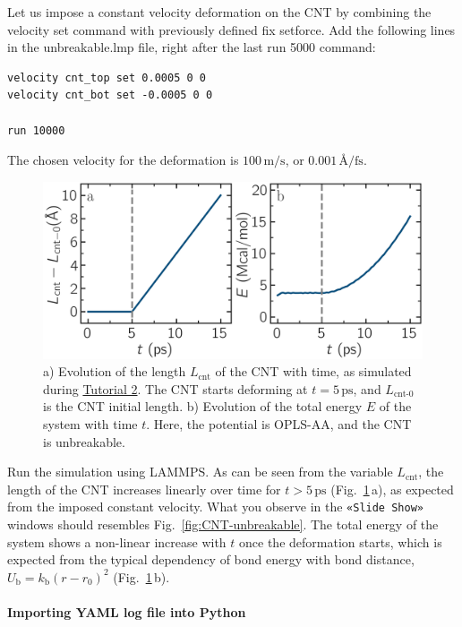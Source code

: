 \documentclass[9pt,tutorial]{livecoms}
\newcommand{\lmpcmd}[1]{\hspace{0pt}\colorbox{listing}{\textcolor{command}{\small{#1}}}\hspace{0pt}} %
\newcommand{\guicmd}[1]{\textcolor{command}{\texttt{«#1»}}} %
\begin{document}
Let us impose a constant velocity deformation on the CNT
by combining the \lmpcmd{velocity set} command with previously defined
\lmpcmd{fix setforce}.  Add the following lines in the \lmpcmd{unbreakable.lmp}
file, right after the last \lmpcmd{run 5000} command:
\begin{lstlisting}
velocity cnt_top set 0.0005 0 0
velocity cnt_bot set -0.0005 0 0

run 10000
\end{lstlisting}
The chosen velocity for the deformation is $100\,\text{m/s}$, or
$0.001\,\text{\AA{}/fs}$.

\begin{figure}
\centering
\includegraphics[width=\linewidth]{CNT-unbreakable-length-energy}
\caption{a) Evolution of the length $L_\text{cnt}$ of the CNT with time,
as simulated during \hyperref[carbon-nanotube-label]{Tutorial 2}.
The CNT starts deforming at $t = 5\,\text{ps}$, and $L_\text{cnt-0}$ is the
CNT initial length.  b) Evolution of the total energy $E$ of the system
with time $t$.  Here, the potential is OPLS-AA, and the CNT is unbreakable.}
\label{fig:CNT-unbreakable-LE}
\end{figure}

Run the simulation using LAMMPS.  As can be seen from the variable $L_\text{cnt}$, the length
of the CNT increases linearly over time for $t > 5\,\text{ps}$ (Fig.~\ref{fig:CNT-unbreakable-LE}\,a),
as expected from the imposed constant velocity.  What you observe in the \guicmd{Slide Show}
windows should resembles Fig.~\ref{fig:CNT-unbreakable}.  The total energy of the system
shows a non-linear increase with $t$ once the deformation starts, which is expected
from the typical dependency of bond energy with bond distance,
$U_\text{b} = k_\text{b} \left( r - r_0 \right)^2$ (Fig.~\ref{fig:CNT-unbreakable-LE}\,b).

\paragraph{Importing YAML log file into Python}
\end{document}

